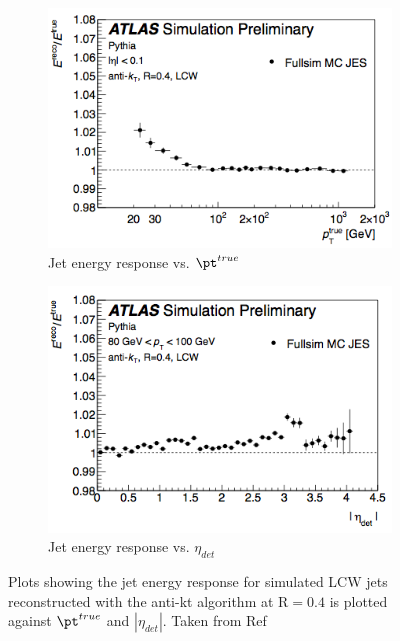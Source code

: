 \begin{figure}[h]
\begin{subfigure}{0.5\textwidth}
   \includegraphics[width=\textwidth]{figures/eResponsePt.png}
	\caption{Jet energy response vs. $\pt^{true}$}
	\label{fig:eResPt}
\end{subfigure} %
\begin{subfigure}{0.5\textwidth}
   \includegraphics[width=\textwidth]{figures/eResponseEta.png}
	\caption{Jet energy response vs. $\eta_{det}$}
	\label{fig:eResEta}
\end{subfigure}
\caption{Plots showing the jet energy response for simulated LCW jets reconstructed with the 
anti-kt algorithm at R$=0.4$ is plotted against $\pt^{true}$ and $|\eta_{det}|$. 
Taken from Ref~\cite{Malaescu:2048678}}
\end{figure}

